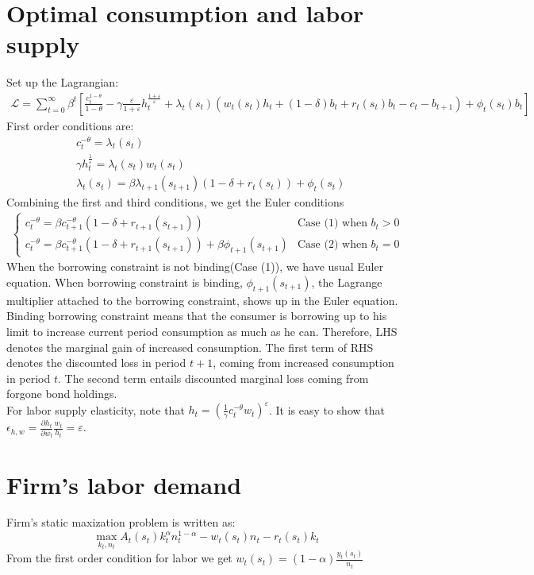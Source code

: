 \documentclass[12pt]{amsart}
\begin{document}
\section{Optimal consumption and labor supply}
Set up the Lagrangian:
\begin{align*}
\mathcal{L} = \sum_{t=0}^{\infty} \beta^t \left[  \frac{c_t^{1-\theta}}{1-\theta}  - \gamma \frac{\varepsilon}{1+\varepsilon} h_t^{\frac{1+\varepsilon}{\varepsilon}} + \lambda_t(s_t) \left( w_t(s_t) h_t + (1-\delta) b_{t} + r_t(s_t) b_{t} - c_t - b_{t+1}  \right) + \phi_t(s_t) b_t \right]
\end{align*}
First order conditions are: 
\begin{align*}
&c_t^{-\theta} = \lambda_t(s_t) \\
& \gamma h_t^{\frac{1}{\varepsilon}} = \lambda_t(s_t) w_t(s_t) \\
& \lambda_t(s_t) = \beta \lambda_{t+1}(s_{t+1}) \left( 1- \delta + r_t(s_t)  \right) + \phi_t(s_t)
\end{align*}
Combining the first and third conditions, we get the Euler conditions 
\begin{align*}
\begin{cases}
c_t^{-\theta} = \beta c_{t+1}^{-\theta} \left( 1- \delta + r_{t+1}(s_{t+1})  \right) & \text{Case (1) when } b_t > 0 \\    
c_t^{-\theta} = \beta c_{t+1}^{-\theta} \left( 1- \delta + r_{t+1}(s_{t+1})  \right)  +  \beta \phi_{t+1}(s_{t+1}) & \text{Case (2) when } b_t = 0    
\end{cases}
\end{align*}
When the borrowing constraint is not binding(Case (1)), we have usual Euler equation. When borrowing constraint is binding, $\phi_{t+1}(s_{t+1})$, the Lagrange multiplier attached to the borrowing constraint, shows up in the Euler equation. Binding borrowing constraint means that the consumer is borrowing up to his limit to increase current period consumption as much as he can. Therefore, LHS denotes the marginal gain of increased consumption. The first term of RHS denotes the discounted loss in period $t+1$, coming from increased consumption in period $t$. The second term entails discounted marginal loss coming from forgone bond holdings. \\

For labor supply elasticity, note that $h_t = \left( \frac{1}{\gamma} c_t^{-\theta} w_t \right)^\varepsilon$. It is easy to show that $\epsilon_{h,w} = \frac{\partial h_t}{\partial w_t} \frac{w_t}{h_t} = \varepsilon$. 
\section{Firm's labor demand}
Firm's static maxization problem is written as: 
\begin{equation*}
\max_{k_t, n_t} A_t(s_t) k_t^\alpha n_t^{1-\alpha} - w_t(s_t) n_t - r_t(s_t) k_t
\end{equation*}
From the first order condition for labor we get $w_t(s_t) = (1-\alpha) \frac{y_t(s_t)}{n_t}$
\end{document}
